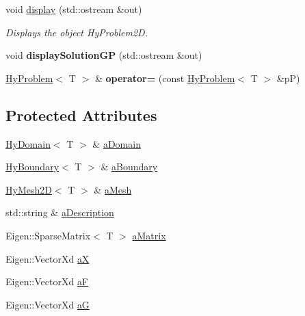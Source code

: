 \begin{DoxyCompactItemize}
\item 
\hypertarget{classHyProblem_a35ab1f86f6069adcfc9d2d958a6181b9}{
void \hyperlink{classHyProblem_a35ab1f86f6069adcfc9d2d958a6181b9}{display} (std::ostream \&out)}
\label{classHyProblem_a35ab1f86f6069adcfc9d2d958a6181b9}

\begin{DoxyCompactList}\small\item\em Displays the object HyProblem2D. \item\end{DoxyCompactList}\item 
\hypertarget{classHyProblem_a826f04877aef38225f7661b37969f946}{
void {\bfseries displaySolutionGP} (std::ostream \&out)}
\label{classHyProblem_a826f04877aef38225f7661b37969f946}

\item 
\hypertarget{classHyProblem_a77b1843d7ea8271849e7d3d804587c12}{
\hyperlink{classHyProblem}{HyProblem}$<$ T $>$ \& {\bfseries operator=} (const \hyperlink{classHyProblem}{HyProblem}$<$ T $>$ \&pP)}
\label{classHyProblem_a77b1843d7ea8271849e7d3d804587c12}

\end{DoxyCompactItemize}
\subsection*{Protected Attributes}
\begin{DoxyCompactItemize}
\item 
\hyperlink{classHyDomain}{HyDomain}$<$ T $>$ \& \hyperlink{classHyProblem_a245270926a69fef2df91e3aad939fee3}{aDomain}
\item 
\hyperlink{classHyBoundary}{HyBoundary}$<$ T $>$ \& \hyperlink{classHyProblem_af7a46447af3592758cb384ac355a30fd}{aBoundary}
\item 
\hyperlink{classHyMesh2D}{HyMesh2D}$<$ T $>$ \& \hyperlink{classHyProblem_a370a94346e3e688f352f60ff1e8ba1ab}{aMesh}
\item 
std::string \& \hyperlink{classHyProblem_a9ff58aa13598c448222203cbb0ad6a10}{aDescription}
\item 
Eigen::SparseMatrix$<$ T $>$ \hyperlink{classHyProblem_a4930e5e04c383d64f8a3eb2dfe24fb54}{aMatrix}
\item 
Eigen::VectorXd \hyperlink{classHyProblem_ad08883fb8ad06aadda0302fc387433cf}{aX}
\item 
Eigen::VectorXd \hyperlink{classHyProblem_a9c31ddb647141522c68ce12c1fc0036b}{aF}
\item 
Eigen::VectorXd \hyperlink{classHyProblem_a3426083f6fd97b687b72b6656db0a224}{aG}
\end{DoxyCompactItemize}


